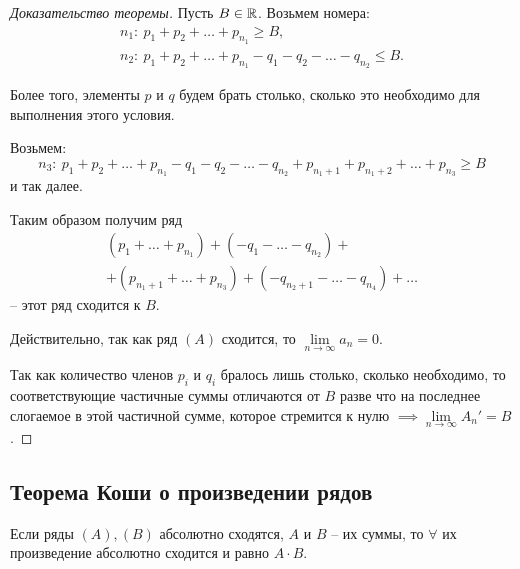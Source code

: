 \begin{proof}[Доказательство теоремы]
    Пусть $B \in \mathbb{R}$. Возьмем номера:
    \[
        \begin{array}{l}
            n_1: \ p_1 + p_2 + \ldots + p_{n_1} \geqslant B, \\
            n_2: \ p_1 + p_2 + \ldots + p_{n_1} - q_1 - q_2 - \ldots - q_{n_2} \leqslant B.
        \end{array}
    \]

    Более того, элементы $p$ и $q$ будем брать столько, сколько это необходимо для выполнения этого условия.

    Возьмем:
    \[
        n_3: \ p_1 + p_2 + \ldots + p_{n_1} - q_1 - q_2 - \ldots - q_{n_2} + p_{n_1 + 1} + p_{n_1 + 2} + \ldots + p_{n_3} \geqslant B
    \] и так далее.

    Таким образом получим ряд
    \begin{multline*}
        (p_1 + \ldots + p_{n_1}) + (-q_1 - \ldots - q_{n_2}) + \\
        + (p_{n_1 + 1} + \ldots + p_{n_3}) + (-q_{n_2 + 1} - \ldots - q_{n_4}) + \ldots
    \end{multline*} -- этот ряд сходится к $B$.

    Действительно, так как ряд $(A)$ сходится, то $\underset{n\rightarrow\infty}{\lim} a_n = 0$.

    Так как количество членов $p_i$ и $q_i$ бралось лишь столько, сколько необходимо, то соответствующие частичные суммы отличаются от $B$ разве что на последнее слогаемое в этой частичной сумме, которое стремится к нулю $\implies \underset{n\rightarrow\infty}{\lim}A_n' = B$.
\end{proof}

\subsection{Теорема Коши о произведении рядов}

\begin{theorem}
    Если ряды $ (A),(B) $ абсолютно сходятся, $A$ и $B$ -- их суммы, то $\forall$ их произведение абсолютно сходится и равно $A \cdot B$.
\end{theorem}

